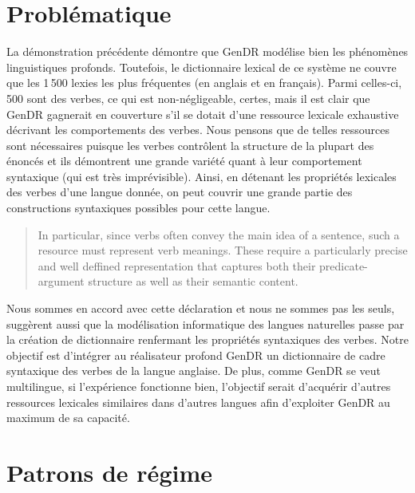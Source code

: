 \section{Problématique}\label{sec:problema}

La démonstration précédente démontre que GenDR modélise bien les phénomènes linguistiques profonds. Toutefois, le dictionnaire lexical de ce système ne couvre que les 1\,500 lexies les plus fréquentes (en anglais et en français). Parmi celles-ci, 500 sont des verbes, ce qui est non-négligeable, certes, mais il est clair que GenDR gagnerait en couverture s'il se dotait d'une ressource lexicale exhaustive décrivant les comportements des verbes. Nous pensons que de telles ressources sont nécessaires puisque les verbes contrôlent la structure de la plupart des énoncés et ils démontrent une grande variété quant à leur comportement syntaxique (qui est très imprévisible). Ainsi, en détenant les propriétés lexicales des verbes d'une langue donnée, on peut couvrir une grande partie des constructions syntaxiques possibles pour cette langue.

\begin{quote}
In particular, since verbs often convey the main idea of a sentence, such a resource must represent verb meanings. These require a particularly precise and well deffined representation that captures both their predicate-argument structure as well as their semantic content.
\end{quote}
\vspace{-\baselineskip}
\hfill
\cite{SchulerVerbnetBroadcoverageComprehensive2005}

Nous sommes en accord avec cette déclaration et nous ne sommes pas les seuls, \cite{Korhonenlargesubcategorizationlexicon2006} suggèrent aussi que la modélisation informatique des langues naturelles passe par la création de dictionnaire renfermant les propriétés syntaxiques des verbes. Notre objectif est d'intégrer au réalisateur profond GenDR un dictionnaire de cadre syntaxique des verbes de la langue anglaise. De plus, comme GenDR se veut multilingue, si l'expérience fonctionne bien, l'objectif serait d'acquérir d'autres ressources lexicales similaires dans d'autres langues afin d'exploiter GenDR au maximum de sa capacité.

\section{Patrons de régime}\label{sec:gp}

